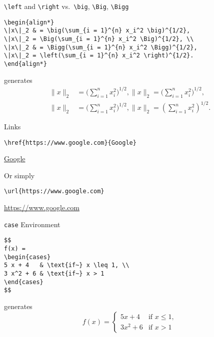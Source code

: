 \begin{frame}[fragile]{\texttt{\textbackslash{}left} and
\texttt{\textbackslash{}right} vs.~\texttt{\textbackslash{}big},
\texttt{\textbackslash{}Big}, \texttt{\textbackslash{}Bigg}}
\protect\hypertarget{left-and-right-vs.-big-big-bigg}{}
\begin{verbatim}
\begin{align*}
\|x\|_2 & = \big(\sum_{i = 1}^{n} x_i^2 \big)^{1/2},
\|x\|_2 = \Big(\sum_{i = 1}^{n} x_i^2 \Big)^{1/2}, \\
\|x\|_2 & = \Bigg(\sum_{i = 1}^{n} x_i^2 \Bigg)^{1/2},
\|x\|_2 = \left(\sum_{i = 1}^{n} x_i^2 \right)^{1/2}.
\end{align*}
\end{verbatim}

generates \begin{align*}
\|x\|_2 & = \big(\sum_{i = 1}^{n} x_i^2 \big)^{1/2},
\|x\|_2 = \Big(\sum_{i = 1}^{n} x_i^2 \Big)^{1/2}, \\
\|x\|_2 & = \Bigg(\sum_{i = 1}^{n} x_i^2 \Bigg)^{1/2},
\|x\|_2 = \left(\sum_{i = 1}^{n} x_i^2 \right)^{1/2}.
\end{align*}
\end{frame}

\begin{frame}[fragile]{Links}
\protect\hypertarget{links}{}
\begin{verbatim}
\href{https://www.google.com}{Google}
\end{verbatim}

\href{https://www.google.com}{Google}

Or simply

\begin{verbatim}
\url{https://www.google.com}
\end{verbatim}

\url{https://www.google.com}
\end{frame}

\begin{frame}[fragile]{\texttt{case} Environment}
\protect\hypertarget{case-environment}{}
\begin{verbatim}
$$
f(x) =
\begin{cases}
5 x + 4   & \text{if~} x \leq 1, \\
3 x^2 + 6 & \text{if~} x > 1
\end{cases}
$$
\end{verbatim}

generates \[
f(x) =
\begin{cases}
5 x + 4   & \text{if~} x \leq 1, \\
3 x^2 + 6 & \text{if~} x > 1
\end{cases}
\]
\end{frame}

